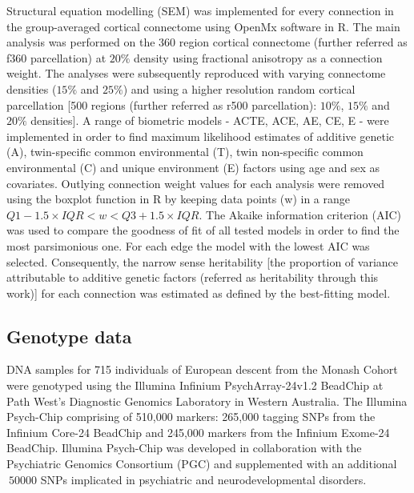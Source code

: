 Structural equation modelling (SEM) was implemented for every connection in the group-averaged cortical connectome using OpenMx software \citep{Boker2011,Neale2016} in R. The main analysis was performed on the 360 region \citep{Glasser2016} cortical connectome (further referred as f360 parcellation) at $20\%$ density using fractional anisotropy as a connection weight. The analyses were subsequently reproduced with varying connectome densities ($15\%$ and $25\%$) and using a higher resolution random cortical parcellation [500 regions (further referred as r500 parcellation): $10\%$, $15\%$ and $20\%$ densities]. A range of biometric models - ACTE, ACE, AE, CE, E - were implemented in order to find maximum likelihood estimates of additive genetic (A), twin-specific common environmental (T), twin non-specific common environmental (C) and unique environment (E) factors using age and sex as covariates. Outlying connection weight values for each analysis were removed using the boxplot function in R by keeping data points (w) in a range $Q1-1.5 \times IQR< w <Q3+1.5 \times IQR$. The Akaike information criterion (AIC) \citep{Akaike1998} was used to compare the goodness of fit of all tested models in order to find the most parsimonious one. For each edge the model with the lowest AIC was selected. Consequently, the narrow sense heritability [the proportion of variance attributable to additive genetic factors (referred as heritability through this work)] for each connection was estimated as defined by the best-fitting model.

\subsection{Genotype data}

DNA samples for 715 individuals of European descent from the Monash Cohort were genotyped using the Illumina Infinium PsychArray-24v1.2 BeadChip at Path West’s Diagnostic Genomics Laboratory in Western Australia. The Illumina Psych-Chip comprising of 510,000 markers: 265,000 tagging SNPs from the Infinium Core-24 BeadChip and 245,000 markers from the Infinium Exome-24 BeadChip. Illumina Psych-Chip was developed in collaboration with the Psychiatric Genomics Consortium (PGC) and supplemented with an additional $~50000$ SNPs implicated in psychiatric and neurodevelopmental disorders.

